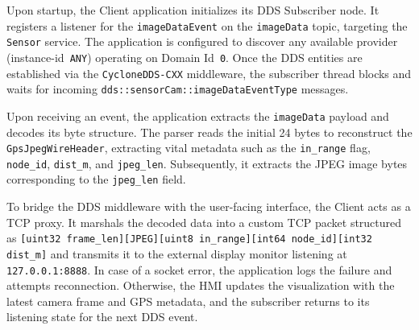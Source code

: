 Upon startup, the Client application initializes its DDS Subscriber node. It registers a listener for the \texttt{imageDataEvent} on the \texttt{imageData} topic, targeting the \texttt{Sensor} service. The application is configured to discover any available provider (instance-id~\texttt{ANY}) operating on Domain Id~\texttt{0}. Once the DDS entities are established via the \texttt{CycloneDDS-CXX} middleware, the subscriber thread blocks and waits for incoming \texttt{dds::sensorCam::imageDataEventType} messages.

Upon receiving an event, the application extracts the \texttt{imageData} payload and decodes its byte structure. The parser reads the initial 24 bytes to reconstruct the \texttt{GpsJpegWireHeader}, extracting vital metadata such as the \texttt{in\_range} flag, \texttt{node\_id}, \texttt{dist\_m}, and \texttt{jpeg\_len}. Subsequently, it extracts the JPEG image bytes corresponding to the \texttt{jpeg\_len} field. 

To bridge the DDS middleware with the user-facing interface, the Client acts as a TCP proxy. It marshals the decoded data into a custom TCP packet structured as \texttt{[uint32 frame\_len][JPEG][uint8 in\_range][int64 node\_id][int32 dist\_m]} and transmits it to the external display monitor listening at \texttt{127.0.0.1:8888}. In case of a socket error, the application logs the failure and attempts reconnection. Otherwise, the HMI updates the visualization with the latest camera frame and GPS metadata, and the subscriber returns to its listening state for the next DDS event.